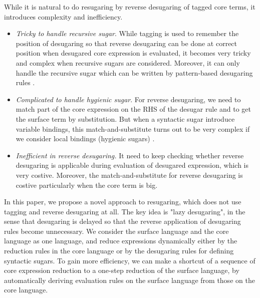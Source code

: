 While it is natural to do resugaring by reverse desugaring of tagged core terms, it introduces complexity and inefficiency.
\begin{itemize}
\item {\em Tricky to handle recursive sugar}. While tagging is used to remember the position of desugaring so that reverse desugaring can be done at correct position when desugared core expression is evaluated, it  becomes very tricky and complex when recursive sugars are considered. Moreover, it can only handle the recursive sugar which can be written by pattern-based desugaring rules \cite{resugaring}.%

\item {\em Complicated to handle hygienic sugar}. For reverse desugaring, we need to match part of the core expression on the RHS of the desugar rule and to get the surface term by substitution. But when a syntactic sugar introduce variable bindings, this match-and-substitute turns out to be very complex if we consider local bindings (hygienic sugars) \cite{hygienic}.

\item {\em Inefficient in reverse desugaring.} It need to keep checking whether reverse desugaring is applicable during evaluation of desugared expression, which is very costive. Moreover, the match-and-substitute for reverse desugaring is costive particularly when the core term is big.

\end{itemize}

In this paper, we propose a novel approach to resugaring, which does not use tagging and reverse desugaring at all.
The key idea is "lazy desugaring", in the sense that desugaring is delayed so that the reverse application of desugaring rules become unnecessary.
We consider the surface language and the core language as one language, and reduce expressions dynamically either by the reduction rules in the core language or by the desugaring rules for defining syntactic sugars. To gain more efficiency, we can make a shortcut of a sequence of core expression reduction to a one-step reduction of the surface language, by automatically deriving evaluation rules on the surface language from those on the core language.


